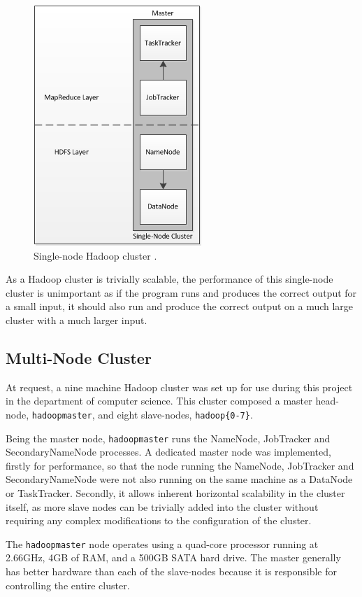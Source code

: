 \begin{figure}[htbp]
  \centering
    \includegraphics{./img/singlenode}
  \caption{Single-node Hadoop cluster \cite{nollsingle}.}
  \label{fig:singlenode}
\end{figure}

As a Hadoop cluster is trivially scalable, the performance of this single-node cluster is unimportant as if the program runs and produces the correct output for a small input, it should also run and produce the correct output on a much large cluster with a much larger input.

\subsection{Multi-Node Cluster}
\label{sec:imp_cluster}
At request, a nine machine Hadoop cluster was set up for use during this project in the department of computer science. This cluster composed a master head-node, {\tt hadoopmaster}, and eight slave-nodes, {\tt hadoop\{0-7\}}. 

Being the master node, {\tt hadoopmaster} runs the NameNode, JobTracker and SecondaryNameNode processes. A dedicated master node was implemented, firstly for performance, so that the node running the NameNode, JobTracker and SecondaryNameNode were not also running on the same machine as a DataNode or TaskTracker. Secondly, it allows inherent horizontal scalability in the cluster itself, as more slave nodes can be trivially added into the cluster without requiring any complex modifications to the configuration of the cluster. 

The {\tt hadoopmaster} node operates using a quad-core processor running at 2.66GHz, 4GB of RAM, and a 500GB SATA hard drive. The master generally has better hardware than each of the slave-nodes because it is responsible for controlling the entire cluster.

